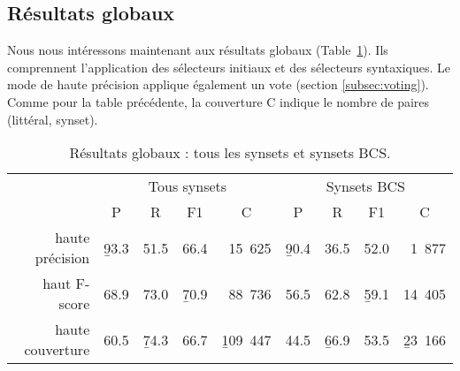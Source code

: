 
\subsection{Résultats globaux}
\label{subsec:allvsbcs}

Nous nous intéressons maintenant aux résultats globaux (Table~\ref{table:allvsbcs}). Ils comprennent l'application des sélecteurs initiaux et des sélecteurs syntaxiques. Le mode de haute précision applique également un vote (section \ref{subsec:voting}). Comme pour la table précédente, la couverture C indique le nombre de paires (littéral, synset).

\begin{table}[ht]
\centering
\begin{tabular}{rcccc|cccc}
  \toprule
                   & \multicolumn{4}{c}{Tous synsets} & \multicolumn{4}{c}{Synsets BCS}     \\
                   &   P      &    R     &   F1     &   C         &   P      &   R      &   F1     &   C    \\
  haute précision  & \b{93.3} & 51.5     & 66.4     & ~15~625     & \b{90.4} & 36.5     & 52.0     & ~1~877 \\
  haut F-score     & 68.9     & 73.0     & \b{70.9} & ~88~736     & 56.5     & 62.8     & \b{59.1} & 14~405 \\
  haute couverture & 60.5     & \b{74.3} & 66.7     & \b{109~447} & 44.5     & \b{66.9} & 53.5     & \b{23~166} \\
  \bottomrule
\end{tabular}
\caption{\protect\centering\label{table:allvsbcs}Résultats globaux : tous les synsets et synsets BCS.}
\end{table}


